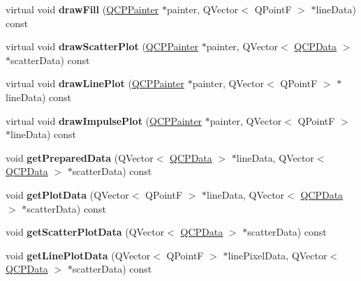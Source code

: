 \begin{DoxyCompactItemize}
\hypertarget{class_q_c_p_graph_a9e6ce6db9aa7b29fc397c724fcf7b126}{}\label{class_q_c_p_graph_a9e6ce6db9aa7b29fc397c724fcf7b126} 
virtual void {\bfseries draw\+Fill} (\hyperlink{class_q_c_p_painter}{Q\+C\+P\+Painter} $\ast$painter, Q\+Vector$<$ Q\+PointF $>$ $\ast$line\+Data) const
\item 
\hypertarget{class_q_c_p_graph_ae1f3edd5eb41aa5782e61673488fd3e0}{}\label{class_q_c_p_graph_ae1f3edd5eb41aa5782e61673488fd3e0} 
virtual void {\bfseries draw\+Scatter\+Plot} (\hyperlink{class_q_c_p_painter}{Q\+C\+P\+Painter} $\ast$painter, Q\+Vector$<$ \hyperlink{class_q_c_p_data}{Q\+C\+P\+Data} $>$ $\ast$scatter\+Data) const
\item 
\hypertarget{class_q_c_p_graph_af460db06d4d6466806721fe101f512e3}{}\label{class_q_c_p_graph_af460db06d4d6466806721fe101f512e3} 
virtual void {\bfseries draw\+Line\+Plot} (\hyperlink{class_q_c_p_painter}{Q\+C\+P\+Painter} $\ast$painter, Q\+Vector$<$ Q\+PointF $>$ $\ast$line\+Data) const
\item 
\hypertarget{class_q_c_p_graph_ac62c84f51d85b78ee583455b8c37ba56}{}\label{class_q_c_p_graph_ac62c84f51d85b78ee583455b8c37ba56} 
virtual void {\bfseries draw\+Impulse\+Plot} (\hyperlink{class_q_c_p_painter}{Q\+C\+P\+Painter} $\ast$painter, Q\+Vector$<$ Q\+PointF $>$ $\ast$line\+Data) const
\item 
\hypertarget{class_q_c_p_graph_ae853c297da9d21b6720d2d1c3b0121bf}{}\label{class_q_c_p_graph_ae853c297da9d21b6720d2d1c3b0121bf} 
void {\bfseries get\+Prepared\+Data} (Q\+Vector$<$ \hyperlink{class_q_c_p_data}{Q\+C\+P\+Data} $>$ $\ast$line\+Data, Q\+Vector$<$ \hyperlink{class_q_c_p_data}{Q\+C\+P\+Data} $>$ $\ast$scatter\+Data) const
\item 
\hypertarget{class_q_c_p_graph_a5ec495f97b8185ba9712430cb1558f52}{}\label{class_q_c_p_graph_a5ec495f97b8185ba9712430cb1558f52} 
void {\bfseries get\+Plot\+Data} (Q\+Vector$<$ Q\+PointF $>$ $\ast$line\+Data, Q\+Vector$<$ \hyperlink{class_q_c_p_data}{Q\+C\+P\+Data} $>$ $\ast$scatter\+Data) const
\item 
\hypertarget{class_q_c_p_graph_a6ea929da420e6c104998060d19740ed6}{}\label{class_q_c_p_graph_a6ea929da420e6c104998060d19740ed6} 
void {\bfseries get\+Scatter\+Plot\+Data} (Q\+Vector$<$ \hyperlink{class_q_c_p_data}{Q\+C\+P\+Data} $>$ $\ast$scatter\+Data) const
\item 
\hypertarget{class_q_c_p_graph_a77314984a7af578a66e939db0db48556}{}\label{class_q_c_p_graph_a77314984a7af578a66e939db0db48556} 
void {\bfseries get\+Line\+Plot\+Data} (Q\+Vector$<$ Q\+PointF $>$ $\ast$line\+Pixel\+Data, Q\+Vector$<$ \hyperlink{class_q_c_p_data}{Q\+C\+P\+Data} $>$ $\ast$scatter\+Data) const

\end{DoxyCompactItemize}
